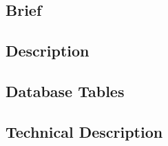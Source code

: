 \subsection{Brief}
\subsection{Description}
\subsection{Database Tables}
\subsection{Technical Description}
